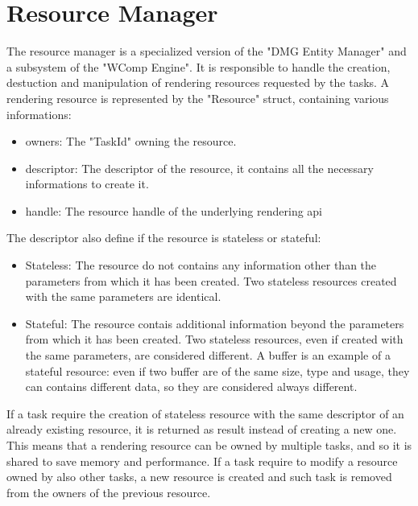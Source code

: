 \newpage
\section{Resource Manager}
The resource manager is a specialized version of the "DMG Entity Manager" and a subsystem of the "WComp Engine". It is responsible to handle the creation, destuction and manipulation of rendering resources requested by the tasks.
A rendering resource is represented by the "Resource" struct, containing various informations:
\begin{itemize}
	\item owners: The "TaskId" owning the resource.
	\item descriptor: The descriptor of the resource, it contains all the necessary informations to create it.
	\item handle: The resource handle of the underlying rendering api
\end{itemize}
The descriptor also define if the resource is stateless or stateful:
\begin{itemize}
	\item Stateless: The resource do not contains any information other than the parameters from which it has been created. Two stateless resources created with the same parameters are identical.
	\item Stateful: The resource contais additional information beyond the parameters from which it has been created. Two stateless resources, even if created with the same parameters, are considered different. A buffer is an example of a stateful resource: even if two buffer are of the same size, type and usage, they can contains different data, so they are considered always different.
\end{itemize}
If a task require the creation of stateless resource with the same descriptor of an already existing resource, it is returned as result instead of creating a new one. This means that a rendering resource can be owned by multiple tasks, and so it is shared to save memory and performance. If a task require to modify a resource owned by also other tasks, a new resource is created and such task is removed from the owners of the previous resource.
